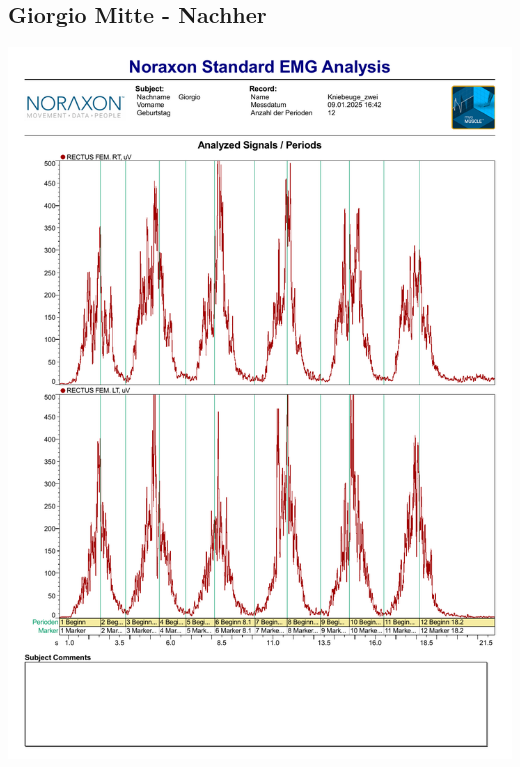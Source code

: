 \subsection*{Giorgio Mitte - Nachher}
\includegraphics[width=.9\textwidth]{img/pdfs/Gio_2_mitte.pdf}
\clearpage

